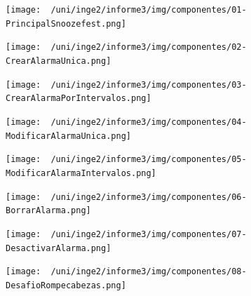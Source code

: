 \begin{figure}[H]
	\centering
	\texttt{[image: ~/uni/inge2/informe3/img/componentes/01-PrincipalSnoozefest.png]}
	\caption{}
        \vspace{5pt}
	\label{fig:}
\end{figure}

\begin{figure}[H]
	\centering
	\texttt{[image: ~/uni/inge2/informe3/img/componentes/02-CrearAlarmaUnica.png]}
	\caption{}
        \vspace{5pt}
	\label{fig:}
\end{figure}

\begin{figure}[H]
	\centering
	\texttt{[image: ~/uni/inge2/informe3/img/componentes/03-CrearAlarmaPorIntervalos.png]}
	\caption{}
        \vspace{5pt}
	\label{fig:}
\end{figure}

\begin{figure}[H]
	\centering
	\texttt{[image: ~/uni/inge2/informe3/img/componentes/04-ModificarAlarmaUnica.png]}
	\caption{}
        \vspace{5pt}
	\label{fig:}
\end{figure}

\begin{figure}[H]
	\centering
	\texttt{[image: ~/uni/inge2/informe3/img/componentes/05-ModificarAlarmaIntervalos.png]}
	\caption{}
        \vspace{5pt}
	\label{fig:}
\end{figure}

\begin{figure}[H]
	\centering
	\texttt{[image: ~/uni/inge2/informe3/img/componentes/06-BorrarAlarma.png]}
	\caption{}
        \vspace{5pt}
	\label{fig:}
\end{figure}

\begin{figure}[H]
	\centering
	\texttt{[image: ~/uni/inge2/informe3/img/componentes/07-DesactivarAlarma.png]}
	\caption{}
        \vspace{5pt}
	\label{fig:}
\end{figure}

\begin{figure}[H]
	\centering
	\texttt{[image: ~/uni/inge2/informe3/img/componentes/08-DesafioRompecabezas.png]}
	\caption{}
        \vspace{5pt}
	\label{fig:}
\end{figure}

